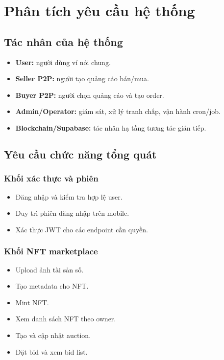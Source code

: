\documentclass[a4paper,12pt]{report}
\begin{document}
\chapter{Phân tích yêu cầu hệ thống}

\section{Tác nhân của hệ thống}
\begin{itemize}
    \item \textbf{User:} người dùng ví nói chung.
    \item \textbf{Seller P2P:} người tạo quảng cáo bán/mua.
    \item \textbf{Buyer P2P:} người chọn quảng cáo và tạo order.
    \item \textbf{Admin/Operator:} giám sát, xử lý tranh chấp, vận hành cron/job.
    \item \textbf{Blockchain/Supabase:} tác nhân hạ tầng tương tác gián tiếp.
\end{itemize}

\section{Yêu cầu chức năng tổng quát}
\subsection{Khối xác thực và phiên}
\begin{itemize}
    \item Đăng nhập và kiểm tra hợp lệ user.
    \item Duy trì phiên đăng nhập trên mobile.
    \item Xác thực JWT cho các endpoint cần quyền.
\end{itemize}

\subsection{Khối NFT marketplace}
\begin{itemize}
    \item Upload ảnh tài sản số.
    \item Tạo metadata cho NFT.
    \item Mint NFT.
    \item Xem danh sách NFT theo owner.
    \item Tạo và cập nhật auction.
    \item Đặt bid và xem bid list.
\end{itemize}
\end{document}
